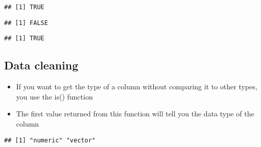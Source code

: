\documentclass[]{article}
\newenvironment{Shaded}{\begin{snugshade}}{\end{snugshade}}
\newcommand{\KeywordTok}[1]{\textcolor[rgb]{0.13,0.29,0.53}{\textbf{#1}}}
\newcommand{\OperatorTok}[1]{\textcolor[rgb]{0.81,0.36,0.00}{\textbf{#1}}}
\newcommand{\NormalTok}[1]{#1}
\providecommand{\tightlist}{%
  \setlength{\itemsep}{0pt}\setlength{\parskip}{0pt}}
\begin{document}
\begin{verbatim}
## [1] TRUE
\end{verbatim}

\begin{Shaded}
\end{Shaded}

\begin{verbatim}
## [1] FALSE
\end{verbatim}

\begin{Shaded}
\end{Shaded}

\begin{verbatim}
## [1] TRUE
\end{verbatim}

\subsection{Data cleaning}\label{data-cleaning-2}

\begin{itemize}
\tightlist
\item
  If you want to get the type of a column without comparing it to other
  types, you use the is() function
\item
  The first value returned from this function will tell you the data
  type of the column
\end{itemize}

\begin{Shaded}
\end{Shaded}

\begin{verbatim}
## [1] "numeric" "vector"
\end{verbatim}

\begin{Shaded}
\end{Shaded}
\end{document}
